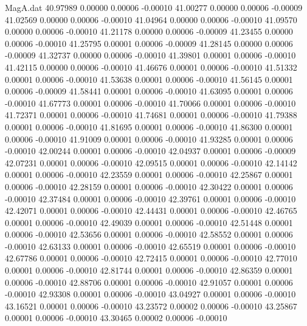 \begin{filecontents}{MagA.dat}
  40.97989    0.00000    0.00006   -0.00010
  41.00277    0.00000    0.00006   -0.00009
  41.02569    0.00000    0.00006   -0.00010
  41.04964    0.00000    0.00006   -0.00010
  41.09570    0.00000    0.00006   -0.00010
  41.21178    0.00000    0.00006   -0.00009
  41.23455    0.00000    0.00006   -0.00010
  41.25795    0.00001    0.00006   -0.00009
  41.28145    0.00000    0.00006   -0.00009
  41.32737    0.00000    0.00006   -0.00010
  41.39801    0.00001    0.00006   -0.00010
  41.42115    0.00000    0.00006   -0.00010
  41.46676    0.00001    0.00006   -0.00010
  41.51332    0.00001    0.00006   -0.00010
  41.53638    0.00001    0.00006   -0.00010
  41.56145    0.00001    0.00006   -0.00009
  41.58441    0.00001    0.00006   -0.00010
  41.63095    0.00001    0.00006   -0.00010
  41.67773    0.00001    0.00006   -0.00010
  41.70066    0.00001    0.00006   -0.00010
  41.72371    0.00001    0.00006   -0.00010
  41.74681    0.00001    0.00006   -0.00010
  41.79388    0.00001    0.00006   -0.00010
  41.81695    0.00001    0.00006   -0.00010
  41.86300    0.00001    0.00006   -0.00010
  41.91009    0.00001    0.00006   -0.00010
  41.93285    0.00001    0.00006   -0.00010
  42.00244    0.00001    0.00006   -0.00010
  42.04937    0.00001    0.00006   -0.00009
  42.07231    0.00001    0.00006   -0.00010
  42.09515    0.00001    0.00006   -0.00010
  42.14142    0.00001    0.00006   -0.00010
  42.23559    0.00001    0.00006   -0.00010
  42.25867    0.00001    0.00006   -0.00010
  42.28159    0.00001    0.00006   -0.00010
  42.30422    0.00001    0.00006   -0.00010
  42.37484    0.00001    0.00006   -0.00010
  42.39761    0.00001    0.00006   -0.00010
  42.42071    0.00001    0.00006   -0.00010
  42.44431    0.00001    0.00006   -0.00010
  42.46765    0.00001    0.00006   -0.00010
  42.49039    0.00001    0.00006   -0.00010
  42.51448    0.00001    0.00006   -0.00010
  42.53656    0.00001    0.00006   -0.00010
  42.58552    0.00001    0.00006   -0.00010
  42.63133    0.00001    0.00006   -0.00010
  42.65519    0.00001    0.00006   -0.00010
  42.67786    0.00001    0.00006   -0.00010
  42.72415    0.00001    0.00006   -0.00010
  42.77010    0.00001    0.00006   -0.00010
  42.81744    0.00001    0.00006   -0.00010
  42.86359    0.00001    0.00006   -0.00010
  42.88706    0.00001    0.00006   -0.00010
  42.91057    0.00001    0.00006   -0.00010
  42.93308    0.00001    0.00006   -0.00010
  43.04927    0.00001    0.00006   -0.00010
  43.16521    0.00001    0.00006   -0.00010
  43.23572    0.00002    0.00006   -0.00010
  43.25867    0.00001    0.00006   -0.00010
  43.30465    0.00002    0.00006   -0.00010

\end{filecontents}
